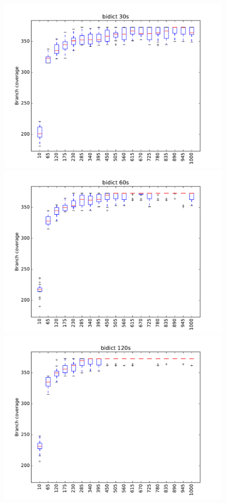 \begin{figure}
\includegraphics[width=\columnwidth]{graphs/bidictrand30}
\includegraphics[width=\columnwidth]{graphs/bidictrand60}
\includegraphics[width=\columnwidth]{graphs/bidictrand120}
\end{figure}


